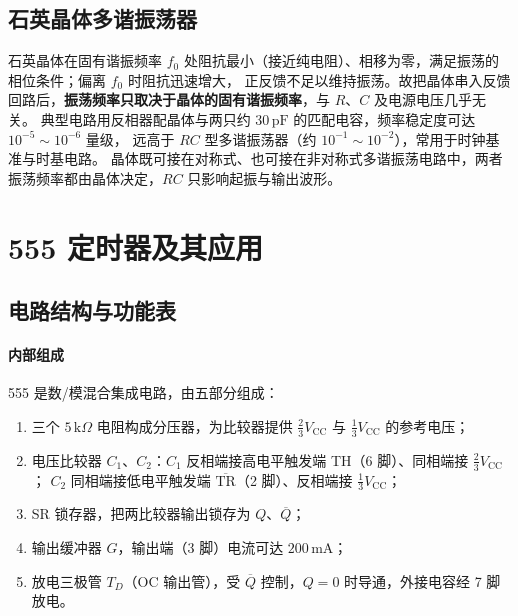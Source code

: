 \subsection{石英晶体多谐振荡器}
石英晶体在固有谐振频率 $f_0$ 处阻抗最小（接近纯电阻）、相移为零，满足振荡的相位条件；偏离 $f_0$ 时阻抗迅速增大，
正反馈不足以维持振荡。故把晶体串入反馈回路后，\textbf{振荡频率只取决于晶体的固有谐振频率}，与 $R$、$C$ 及电源电压几乎无关。
典型电路用反相器配晶体与两只约 $30\,\mathrm{pF}$ 的匹配电容，频率稳定度可达 $10^{-5}\sim10^{-6}$ 量级，
远高于 $RC$ 型多谐振荡器（约 $10^{-1}\sim10^{-2}$），常用于时钟基准与时基电路。
晶体既可接在对称式、也可接在非对称式多谐振荡电路中，两者振荡频率都由晶体决定，$RC$ 只影响起振与输出波形。

\section{555 定时器及其应用}
\subsection{电路结构与功能表}
\paragraph{内部组成}
555 是数/模混合集成电路，由五部分组成：
\begin{enumerate}
    \item 三个 $5\,\mathrm{k}\Omega$ 电阻构成分压器，为比较器提供 $\frac{2}{3}V_\text{CC}$ 与 $\frac{1}{3}V_\text{CC}$ 的参考电压；
    \item 电压比较器 $C_1$、$C_2$：$C_1$ 反相端接高电平触发端 TH（6 脚）、同相端接 $\frac{2}{3}V_\text{CC}$；
    $C_2$ 同相端接低电平触发端 $\overline{\text{TR}}$（2 脚）、反相端接 $\frac{1}{3}V_\text{CC}$；
    \item SR 锁存器，把两比较器输出锁存为 $Q$、$\overline{Q}$；
    \item 输出缓冲器 $G$，输出端（3 脚）电流可达 $200\,\mathrm{mA}$；
    \item 放电三极管 $T_D$（OC 输出管），受 $\overline{Q}$ 控制，$Q=0$ 时导通，外接电容经 7 脚放电。
\end{enumerate}

